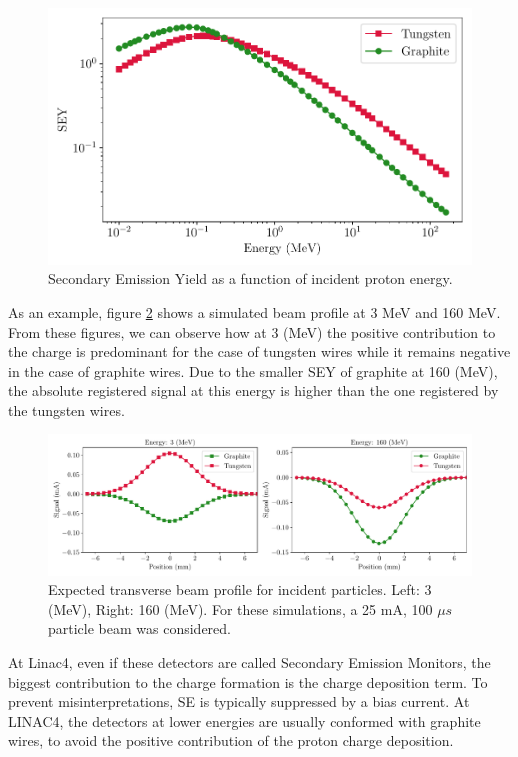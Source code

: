 \begin{figure}[h]
    \centering
    \includegraphics[width=0.85\columnwidth]{Figure_SEY/SEY_compa.pdf}
    \caption{Secondary Emission Yield as a function of incident proton energy. }
    \label{fig:SEYmat}
\end{figure}

As an example, figure \ref{fig:ProfComparison} shows a simulated beam profile at 3 MeV and 160 MeV. From these figures, we can observe how at 3 (MeV) the positive contribution to the charge is predominant for the case of tungsten wires while it remains negative in the case of graphite wires. Due to the smaller SEY of graphite at 160 (MeV), the absolute registered signal at this energy is higher than the one registered by the tungsten wires. 

\begin{figure}[h]
    \centering
    \includegraphics[width=0.85\columnwidth]{Figure_ProfCompa/ProfileComparison.pdf}
    \caption{Expected transverse beam profile for incident \hm particles. Left: 3 (MeV), Right: 160 (MeV). For these simulations, a 25 mA, 100 $\mu s$ particle beam was considered. }
    \label{fig:ProfComparison}
\end{figure}

At Linac4, even if these detectors are called Secondary Emission Monitors, the biggest contribution to the charge formation is the charge deposition term. To prevent misinterpretations, SE is typically suppressed by a bias current.  At LINAC4, the detectors at lower energies are usually conformed with graphite wires, to avoid the positive contribution of the proton charge deposition. 
